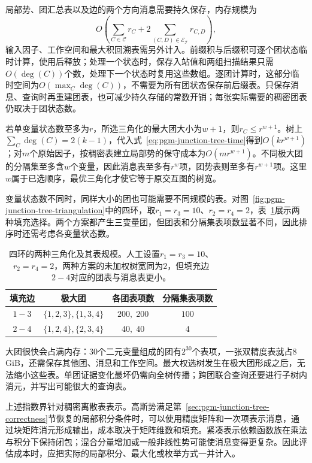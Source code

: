 局部势、团汇总表以及边的两个方向消息需要持久保存，内存规模为
\begin{equation}
  O\!\left(
    \sum_{C\in\mathcal{C}}r_C+
    2\sum_{(C,D)\in\mathcal{E}_{\mathcal{T}}}r_{C,D}
  \right),
  \label{eq:pgm-junction-tree-memory}
\end{equation}
输入因子、工作空间和最大积回溯表需另外计入。前缀积与后缀积可逐个团状态临时计算，使用后释放；处理一个状态时，保存入站值和两组扫描结果只需$O(\deg(C))$个数，处理下一个状态时复用这些数组。逐团计算时，这部分临时空间为$O(\max_C\deg(C))$，不需要为所有团状态保存前后缀表。只保存消息、查询时再重建团表，也可减少持久存储的常数开销；每张实际需要的稠密团表仍取决于团状态数。

若单变量状态数至多为$r$，所选三角化的最大团大小为$w+1$，则$r_C\le r^{w+1}$。树上$\sum_C\deg(C)=2(k-1)$，代入式~\eqref{eq:pgm-junction-tree-time}得到$O(kr^{w+1})$；对$m$个原始因子，按稠密表建立局部势的保守成本为$O(mr^{w+1})$。不同极大团的分隔集至多含$w$个变量，因此消息表至多有$r^w$项，团势表则至多有$r^{w+1}$项。这里$w$属于已选顺序，最优三角化才使它等于原交互图的树宽。

变量状态数不同时，同样大小的团也可能需要不同规模的表。对图~\ref{fig:pgm-junction-tree-triangulation}中的四环，取$r_1=r_3=10$、$r_2=r_4=2$，表~\ref{tab:pgm-junction-tree-triangulation-cost}展示两种填充选择。两个方案都产生三变量团，但团表和分隔集表项数显著不同，因此排序时还需考虑各变量状态数。

\begin{table}[htbp]
  \centering
  \begin{tabular}{cccc}
    \toprule
    填充边 & 极大团 & 各团表项数 & 分隔集表项数\\
    \midrule
    $1-3$ & $\{1,2,3\},\{1,3,4\}$ & $200,\;200$ & $100$\\
    $2-4$ & $\{1,2,4\},\{2,3,4\}$ & $40,\;40$ & $4$\\
    \bottomrule
  \end{tabular}
  \caption{四环的两种三角化及其表规模。人工设置$r_1=r_3=10$、$r_2=r_4=2$，两种方案的未加权树宽同为$2$，但填充边$2-4$对应的团表与消息表更小。}
  \label{tab:pgm-junction-tree-triangulation-cost}
\end{table}

大团很快会占满内存：$30$个二元变量组成的团有$2^{30}$个表项，一张双精度表就占$8$\,GiB，还需保存其他团、消息和工作空间。最大权选树发生在极大团形成之后，无法缩小这些表。单团证据变化最坏仍需向全树传播；跨团联合查询还要进行子树内消元，并写出可能很大的查询表。

上述指数界针对稠密离散表表示。高斯势满足第~\ref{sec:pgm-junction-tree-correctness}节恢复的局部积分条件时，可以使用精度矩阵和一次项表示消息，通过块矩阵消元形成输出，成本取决于矩阵维数和填充。紧凑表示依赖函数族在乘法与积分下保持闭包；混合分量增加或一般非线性势可能使消息变得更复杂。因此评估成本时，应把实际的局部积分、最大化或枚举方式一并计入。


